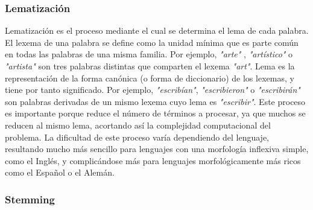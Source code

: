 \subsubsection{Lematización}
Lematización es el proceso mediante el cual se determina el lema de cada palabra. El lexema de una palabra se define como la unidad mínima que es parte común en todas las palabras de una misma familia. Por ejemplo, \textsl{"arte"} , \textsl{"artístico"} o \textsl{"artista"} son tres palabras distintas que comparten el lexema \textsl{"art"}. Lema es la representación de la forma canónica (o forma de diccionario) de los lexemas, y tiene por tanto significado. Por ejemplo, \textsl{"escribían"}, \textsl{"escribieron"} o \textsl{"escribirán"} son palabras derivadas de un mismo lexema cuyo lema es \textsl{"escribir"}.\newline
Este proceso es importante porque reduce el número de términos a procesar, ya que muchos se reducen al mismo lema, acortando así la complejidad computacional del problema. La dificultad de este proceso varía dependiendo del lenguaje, resultando mucho más sencillo para lenguajes con una morfología inflexiva simple, como el Inglés, y complicándose más para lenguajes morfológicamente más ricos como el Español o el Alemán.  
\subsubsection{Stemming} 
 




 